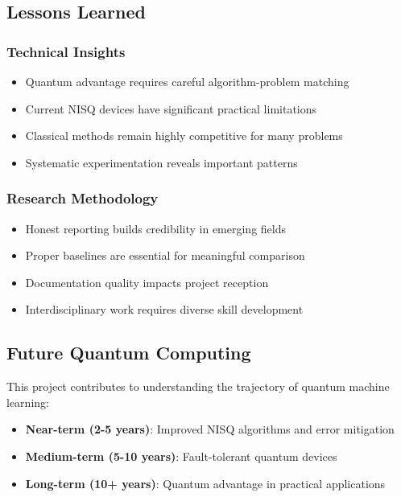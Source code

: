 \documentclass[11pt,a4paper]{article}
\begin{document}
\subsection{Lessons Learned}

\subsubsection{Technical Insights}
\begin{itemize}
    \item Quantum advantage requires careful algorithm-problem matching
    \item Current NISQ devices have significant practical limitations
    \item Classical methods remain highly competitive for many problems
    \item Systematic experimentation reveals important patterns
\end{itemize}

\subsubsection{Research Methodology}
\begin{itemize}
    \item Honest reporting builds credibility in emerging fields
    \item Proper baselines are essential for meaningful comparison
    \item Documentation quality impacts project reception
    \item Interdisciplinary work requires diverse skill development
\end{itemize}

\subsection{Future Quantum Computing}

This project contributes to understanding the trajectory of quantum machine learning:

\begin{itemize}
    \item \textbf{Near-term (2-5 years)}: Improved NISQ algorithms and error mitigation
    \item \textbf{Medium-term (5-10 years)}: Fault-tolerant quantum devices
    \item \textbf{Long-term (10+ years)}: Quantum advantage in practical applications
\end{itemize}
\end{document}

